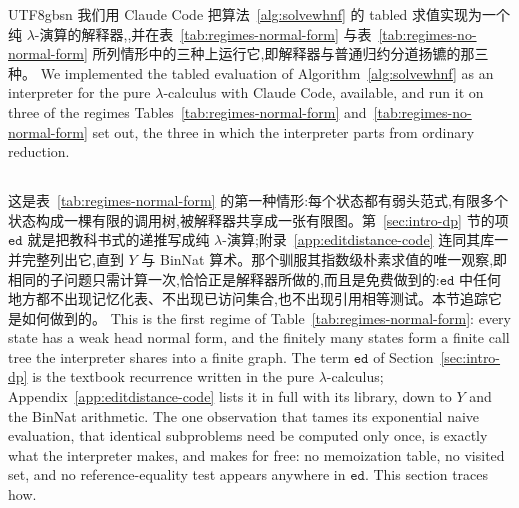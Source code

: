 \begin{CJK*}{UTF8}{gbsn}
  \ifPaperChinese
  我们用 Claude Code 把算法~\ref{alg:solvewhnf} 的 tabled 求值实现为一个纯 $\lambda$-演算的解释器,,并在表~\ref{tab:regimes-normal-form} 与表~\ref{tab:regimes-no-normal-form} 所列情形中的三种上运行它,即解释器与普通归约分道扬镳的那三种。
  \else
  We implemented the tabled evaluation of Algorithm~\ref{alg:solvewhnf} as an interpreter for the pure $\lambda$-calculus with Claude Code, available, and run it on three of the regimes Tables~\ref{tab:regimes-normal-form} and~\ref{tab:regimes-no-normal-form} set out, the three in which the interpreter parts from ordinary reduction.
  \fi

  \subsection{}\label{sec:application-sharing}

  \ifPaperChinese
  这是表~\ref{tab:regimes-normal-form} 的第一种情形:每个状态都有弱头范式,有限多个状态构成一棵有限的调用树,被解释器共享成一张有限图。第~\ref{sec:intro-dp} 节的项 $\mathtt{ed}$ 就是把教科书式的递推写成纯 $\lambda$-演算;附录~\ref{app:editdistance-code} 连同其库一并完整列出它,直到 $Y$ 与 BinNat 算术。那个驯服其指数级朴素求值的唯一观察,即相同的子问题只需计算一次,恰恰正是解释器所做的,而且是免费做到的:$\mathtt{ed}$ 中任何地方都不出现记忆化表、不出现已访问集合,也不出现引用相等测试。本节追踪它是如何做到的。
  \else
  This is the first regime of Table~\ref{tab:regimes-normal-form}: every state has a weak head normal form, and the finitely many states form a finite call tree the interpreter shares into a finite graph. The term $\mathtt{ed}$ of Section~\ref{sec:intro-dp} is the textbook recurrence written in the pure $\lambda$-calculus; Appendix~\ref{app:editdistance-code} lists it in full with its library, down to $Y$ and the BinNat arithmetic. The one observation that tames its exponential naive evaluation, that identical subproblems need be computed only once, is exactly what the interpreter makes, and makes for free: no memoization table, no visited set, and no reference-equality test appears anywhere in $\mathtt{ed}$. This section traces how.
  \fi


\end{CJK*}
